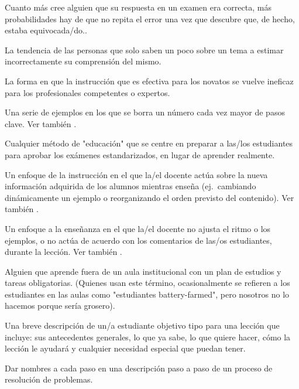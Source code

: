 \begin{description}
 Cuanto más cree alguien
que su respuesta en un examen era correcta, más probabilidades hay de que no
repita el error una vez que descubre que, de hecho, estaba equivocada/do..

 La tendencia de las personas que solo saben  un poco sobre un tema a estimar incorrectamente su comprensión del mismo.

 La forma en que
la instrucción que es efectiva para los novatos se vuelve ineficaz para
los profesionales competentes o expertos.

 Una serie de ejemplos en los que
se borra un número cada vez mayor de pasos clave. Ver
también .

 Cualquier método de "educación"
que se centre en preparar a las/los estudiantes para aprobar los exámenes estandarizados, en lugar de aprender realmente.

 Un enfoque de la instrucción en el que la/el docente
actúa sobre la nueva información adquirida de los alumnos mientras enseña (ej.\ cambiando
dinámicamente un ejemplo o reorganizando el orden previsto del contenido).
Ver también .

 Un enfoque a la enseñanza en el que la/el docente no ajusta el ritmo o los ejemplos, o no actúa de acuerdo con los comentarios de las/os estudiantes, durante la lección.  Ver también .

 Alguien que aprende fuera de un aula institucional con un plan de estudios y tareas obligatorias. (Quienes usan este término, ocasionalmente se refieren a los estudiantes en las aulas como "estudiantes battery-farmed", pero nosotros no lo hacemos porque sería grosero).

 Una breve descripción de un/a estudiante objetivo tipo para una lección que incluye: sus antecedentes generales, lo que ya sabe, lo que quiere hacer, cómo la lección le ayudará y cualquier necesidad especial que puedan tener.

 Dar nombres a cada paso en una descripción paso a paso de un proceso de resolución de problemas.


\end{description}
